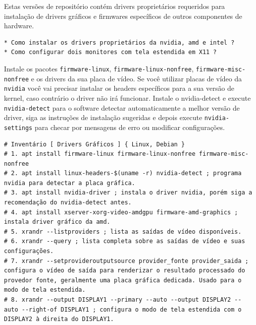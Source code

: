 \documentclass[12pt,a4paper]{article}
\begin{document}
\vspace{\baselineskip}

Estas versões de repositório contém drivers proprietários requeridos para instalação de drivers gráficos e firmwares específicos de outros componentes de hardware.\\

\begin{lstlisting}
* Como instalar os drivers proprietários da nvidia, amd e intel ?
* Como configurar dois monitores com tela estendida em X11 ? 
\end{lstlisting}

\vspace{\baselineskip}

Instale os pacotes \texttt{firmware-linux}, \texttt{firmware-linux-nonfree}, \texttt{firmware-misc-nonfree} e os drivers da sua placa de vídeo. Se você utilizar placas de vídeo da \texttt{nvidia} você vai precisar instalar os headers específicos para a sua versão de kernel, caso contrário o driver não irá funcionar. Instale o nvidia-detect e execute \texttt{nvidia-detect} para o software detectar automaticamente a melhor versão de driver, siga as instruções de instalação sugeridas e depois execute \texttt{nvidia-settings} para checar por mensagens de erro ou modificar configurações.\\

\begin{lstlisting}
# Inventário [ Drivers Gráficos ] { Linux, Debian }
# 1. apt install firmware-linux firmware-linux-nonfree firmware-misc-nonfree
# 2. apt install linux-headers-$(uname -r) nvidia-detect ; programa nvidia para detectar a placa gráfica.
# 3. apt install nvidia-driver ; instala o driver nvidia, porém siga a recomendação do nvidia-detect antes.
# 4. apt install xserver-xorg-video-amdgpu firmware-amd-graphics ; instala driver gráfico da amd.
# 5. xrandr --listproviders ; lista as saídas de vídeo disponíveis.
# 6. xrandr --query ; lista completa sobre as saídas de vídeo e suas configurações.
# 7. xrandr --setprovideroutputsource provider_fonte provider_saida ; configura o vídeo de saída para renderizar o resultado processado do provedor fonte, geralmente uma placa gráfica dedicada. Usado para o modo de tela estendida. 
# 8. xrandr --output DISPLAY1 --primary --auto --output DISPLAY2 --auto --right-of DISPLAY1 ; configura o modo de tela estendida com o DISPLAY2 à direita do DISPLAY1.
\end{lstlisting}

\vspace{\baselineskip}
\end{document}
